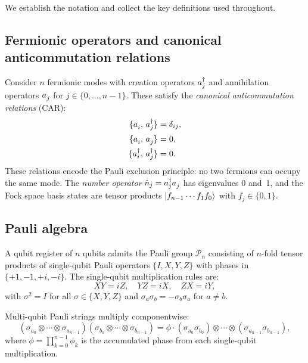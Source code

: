 %

We establish the notation and collect the key definitions used
throughout.

\subsection{Fermionic operators and canonical anticommutation relations}

Consider $n$ fermionic modes with creation operators $a_{j}^{\dagger}$ and
annihilation operators $\an{j}$ for $j \in \{0, \ldots, n{-}1\}$.
These satisfy the \emph{canonical anticommutation relations} (CAR):
\begin{align}
  \acomm{\an{i}}{\ad{j}} &= \delta_{ij}, \label{eq:car1} \\
  \acomm{\an{i}}{\an{j}} &= 0, \label{eq:car2} \\
  \acomm{\ad{i}}{\ad{j}} &= 0. \label{eq:car3}
\end{align}
These relations encode the Pauli exclusion principle: no two fermions
can occupy the same mode.  The \emph{number operator}
$\nhat{j} = \ad{j}\an{j}$ has eigenvalues 0 and~1, and the Fock space
basis states are tensor products $\ket{f_{n-1} \cdots f_1 f_0}$ with
$f_j \in \{0, 1\}$.

\subsection{Pauli algebra}
\label{sec:pauli-algebra}

A qubit register of $n$ qubits admits the Pauli group $\mathcal{P}_n$
consisting of $n$-fold tensor products of single-qubit Pauli operators
$\{I, X, Y, Z\}$ with phases in $\{+1, -1, +i, -i\}$.  The
single-qubit multiplication rules are:
\begin{equation}
  XY = iZ, \quad YZ = iX, \quad ZX = iY,
  \label{eq:pauli-products}
\end{equation}
with $\sigma^2 = I$ for all $\sigma \in \{X, Y, Z\}$ and
$\sigma_a \sigma_b = -\sigma_b \sigma_a$ for $a \neq b$.

Multi-qubit Pauli strings multiply componentwise:
\begin{equation}
  (\sigma_{a_0} \otimes \cdots \otimes \sigma_{a_{n-1}})
  (\sigma_{b_0} \otimes \cdots \otimes \sigma_{b_{n-1}})
  = \phi \cdot
  (\sigma_{a_0}\sigma_{b_0}) \otimes \cdots \otimes
  (\sigma_{a_{n-1}}\sigma_{b_{n-1}}),
  \label{eq:pauli-mult}
\end{equation}
where $\phi = \prod_{k=0}^{n-1} \phi_k$ is the accumulated phase from
each single-qubit multiplication.

